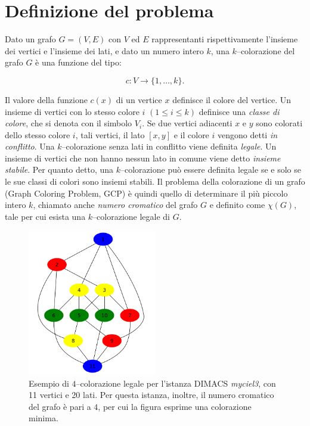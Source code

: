 \documentclass[a4paper,10pt]{article}
\begin{document}
\section{Definizione del problema}
Dato un grafo $G=(V,E)$ con $V$ ed $E$ rappresentanti rispettivamente l'insieme dei vertici e l'insieme dei lati, e dato un numero intero $k$, una $k$--colorazione del grafo $G$ è una funzione del tipo: 

\begin{displaymath}
c:V\rightarrow\{1,\ldots,k\}\textrm{.}
\end{displaymath}

Il valore della funzione $c(x)$ di un vertice $x$ definisce il colore del vertice. Un insieme di vertici con lo stesso colore $i$ $(1\leq i \leq k)$ definisce una \emph{classe di colore}, che si denota con il simbolo $V_{i}$. Se due vertici adiacenti $x$ e $y$ sono colorati dello stesso colore $i$, tali vertici, il lato $[x,y]$ e il colore $i$ vengono detti \emph{in conflitto}. Una $k$--colorazione senza lati in conflitto viene definita \emph{legale}. Un insieme di vertici che non hanno nessun lato in comune viene detto \emph{insieme stabile}. Per quanto detto, una $k$--colorazione può essere definita legale se e solo se le sue classi di colori sono insiemi stabili. Il problema della colorazione di un grafo (Graph Coloring Problem, GCP) è quindi quello di determinare il più piccolo intero $k$, chiamato anche \emph{numero cromatico} del grafo $G$ e definito come $\chi(G)$, tale per cui esista una $k$--colorazione legale di $G$.

\begin{figure}[hp]
\begin{center}
 \includegraphics[width=0.5\textwidth]{img/ok}
\caption[Esempio di colorazione]{Esempio di $4$--colorazione legale per l'istanza DIMACS \emph{myciel3}, con 11 vertici e 20 lati. Per questa istanza, inoltre, il numero cromatico del grafo è pari a $4$, per cui la figura esprime una colorazione minima.}
\end{center}
\end{figure}
\end{document}
